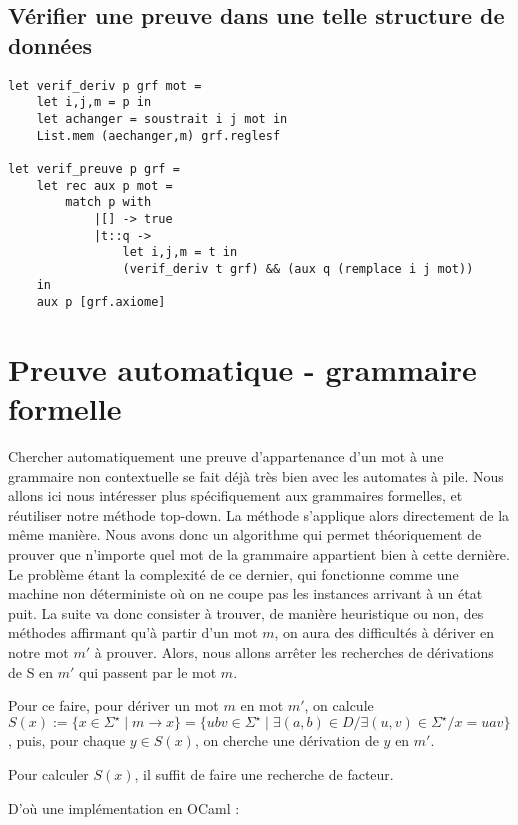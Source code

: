 \documentclass[a4paper,12pt]{article}
\begin{document}
\subsection{Vérifier une preuve dans une telle structure de données}

{\color{DarkBlue}\begin{verbatim}
let verif_deriv p grf mot = 
    let i,j,m = p in
    let achanger = soustrait i j mot in
    List.mem (aechanger,m) grf.reglesf

let verif_preuve p grf = 
    let rec aux p mot = 
        match p with
            |[] -> true
            |t::q -> 
                let i,j,m = t in
                (verif_deriv t grf) && (aux q (remplace i j mot))
    in 
    aux p [grf.axiome]

\end{verbatim}}

\section{Preuve automatique - grammaire formelle}

Chercher automatiquement une preuve d'appartenance d'un mot à une grammaire non contextuelle se fait déjà très bien avec les automates à pile.
Nous allons ici nous intéresser plus spécifiquement aux grammaires formelles, et réutiliser notre méthode top-down.
La méthode s'applique alors directement de la même manière.
Nous avons donc un algorithme qui permet théoriquement de prouver que n'importe quel mot de la grammaire appartient bien à cette dernière.
Le problème étant la complexité de ce dernier, qui fonctionne comme une machine non déterministe où on ne coupe pas les instances arrivant à un état puit.
La suite va donc consister à trouver, de manière heuristique ou non, des méthodes affirmant qu'à partir d'un mot $m$, on aura des difficultés à dériver en notre mot $m'$ à prouver.
Alors, nous allons arrêter les recherches de dérivations de S en $m'$ qui passent par le mot $m$.

Pour ce faire, pour dériver un mot $m$ en mot $m'$, on calcule $S(x) := \{x \in \Sigma^\star \mid m \rightarrow x\} 
=\{ubv \in \Sigma^\star \mid \exists (a,b) \in D / \exists (u,v)\in \Sigma^\star / x = uav\}$,
puis, pour chaque $ y \in S(x)$, on cherche une dérivation de $y$ en $m'$.

Pour calculer $S(x)$, il suffit de faire une recherche de facteur.

D'où une implémentation en OCaml : 
\end{document}
